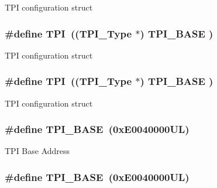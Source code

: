 T\-P\-I configuration struct \hypertarget{group___c_m_s_i_s__core__base_ga8b4dd00016aed25a0ea54e9a9acd1239}{
\subsubsection[{T\-P\-I}]{\setlength{\rightskip}{0pt plus 5cm}\#define T\-P\-I~(({\bf T\-P\-I\-\_\-\-Type}       $\ast$)     {\bf T\-P\-I\-\_\-\-B\-A\-S\-E}      )}}\label{group___c_m_s_i_s__core__base_ga8b4dd00016aed25a0ea54e9a9acd1239}
T\-P\-I configuration struct \hypertarget{group___c_m_s_i_s__core__base_ga8b4dd00016aed25a0ea54e9a9acd1239}{
\subsubsection[{T\-P\-I}]{\setlength{\rightskip}{0pt plus 5cm}\#define T\-P\-I~(({\bf T\-P\-I\-\_\-\-Type}       $\ast$)     {\bf T\-P\-I\-\_\-\-B\-A\-S\-E}      )}}\label{group___c_m_s_i_s__core__base_ga8b4dd00016aed25a0ea54e9a9acd1239}
T\-P\-I configuration struct \hypertarget{group___c_m_s_i_s__core__base_ga2b1eeff850a7e418844ca847145a1a68}{
\subsubsection[{T\-P\-I\-\_\-\-B\-A\-S\-E}]{\setlength{\rightskip}{0pt plus 5cm}\#define T\-P\-I\-\_\-\-B\-A\-S\-E~(0x\-E0040000\-U\-L)}}\label{group___c_m_s_i_s__core__base_ga2b1eeff850a7e418844ca847145a1a68}
T\-P\-I Base Address \hypertarget{group___c_m_s_i_s__core__base_ga2b1eeff850a7e418844ca847145a1a68}{
\subsubsection[{T\-P\-I\-\_\-\-B\-A\-S\-E}]{\setlength{\rightskip}{0pt plus 5cm}\#define T\-P\-I\-\_\-\-B\-A\-S\-E~(0x\-E0040000\-U\-L)}}\label{group___c_m_s_i_s__core__base_ga2b1eeff850a7e418844ca847145a1a68}
